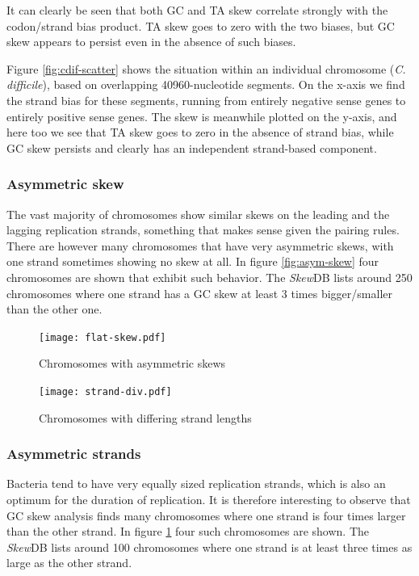 \documentclass[fleqn,10pt]{wlscirep}
\begin{document}
It can clearly be seen that both GC and TA skew correlate strongly with the codon/strand bias product. TA skew goes to zero with the two biases, but GC skew appears to persist even in the absence of such biases.

Figure \ref{fig:cdif-scatter} shows the situation within an individual chromosome (\emph{C. difficile}), based on overlapping 40960-nucleotide segments. On the x-axis we find the strand bias for these segments, running from entirely negative sense genes to entirely positive sense genes. The skew is meanwhile plotted on the y-axis, and here too we see that TA skew goes to zero in the absence of strand bias, while GC skew persists and clearly has an independent strand-based component.

\subsubsection*{Asymmetric skew}
The vast majority of chromosomes show similar skews on the leading and the lagging replication strands, something that makes sense given the pairing rules. There are however many chromosomes that have very asymmetric skews, with one strand sometimes showing no skew at all. In figure \ref{fig:asym-skew} four chromosomes are shown that exhibit such behavior. The \emph{Skew}DB lists around 250 chromosomes where one strand has a GC skew at least 3 times bigger/smaller than the other one.

\begin{figure}[ht]
  \centering
  \begin{minipage}[b]{0.45\linewidth}
    \texttt{[image: flat-skew.pdf]}
    \caption{Chromosomes with asymmetric skews}
    \label{fig:asym-skew}
  \end{minipage}
  \quad
  \begin{minipage}[b]{0.45\linewidth}
    \texttt{[image: strand-div.pdf]}
    \caption{Chromosomes with differing strand lengths}
    \label{fig:strand-div}
  \end{minipage}
\end{figure}

\subsubsection*{Asymmetric strands}
Bacteria tend to have very equally sized replication strands, which is also an optimum for the duration of replication. It is therefore interesting to observe that GC skew analysis finds many chromosomes where one strand is four times larger than the other strand.  In  figure \ref{fig:strand-div} four such chromosomes are shown. The \emph{Skew}DB lists around 100 chromosomes where one strand is at least three times as large as the other strand.
\end{document}
